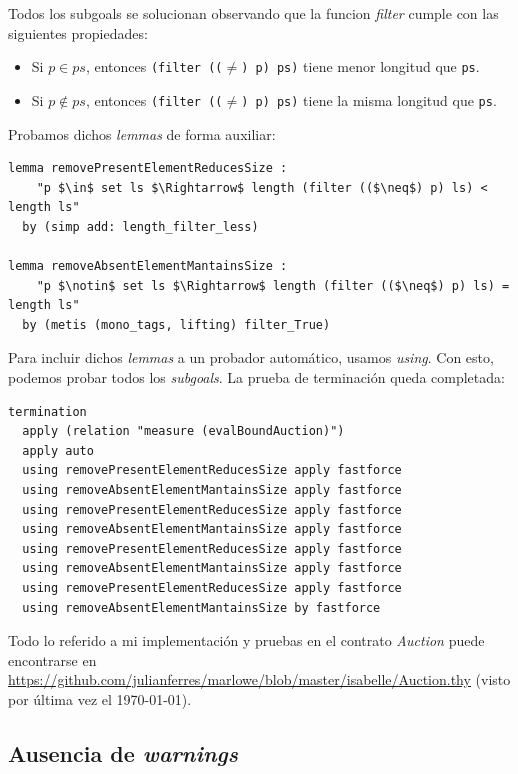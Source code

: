 \documentclass[12pt]{book}
\begin{document}
Todos los subgoals se solucionan observando que la funcion \textit{filter} cumple con las siguientes propiedades:

\begin{itemize}
    \item Si $p \in ps$, entonces \texttt{(filter (($\neq$) p) ps)} tiene menor longitud que \texttt{ps}. 
    \item Si $p \notin ps$, entonces \texttt{(filter (($\neq$) p) ps)} tiene la misma longitud que \texttt{ps}. 
\end{itemize}

Probamos dichos \textit{lemmas} de forma auxiliar:

\begin{lstlisting}[style=Isabelle]
lemma removePresentElementReducesSize :
    "p $\in$ set ls $\Rightarrow$ length (filter (($\neq$) p) ls) < length ls"
  by (simp add: length_filter_less)

lemma removeAbsentElementMantainsSize : 
    "p $\notin$ set ls $\Rightarrow$ length (filter (($\neq$) p) ls) = length ls"
  by (metis (mono_tags, lifting) filter_True)
\end{lstlisting}


Para incluir dichos \textit{lemmas} a un probador automático, usamos \textit{using}. Con esto, podemos probar todos los \textit{subgoals}. La prueba de terminación queda completada:

\begin{lstlisting}[style=Isabelle]
termination 
  apply (relation "measure (evalBoundAuction)")
  apply auto 
  using removePresentElementReducesSize apply fastforce
  using removeAbsentElementMantainsSize apply fastforce
  using removePresentElementReducesSize apply fastforce
  using removeAbsentElementMantainsSize apply fastforce
  using removePresentElementReducesSize apply fastforce
  using removeAbsentElementMantainsSize apply fastforce
  using removePresentElementReducesSize apply fastforce
  using removeAbsentElementMantainsSize by fastforce
\end{lstlisting}

Todo lo referido a mi implementación y pruebas en el contrato \textit{Auction} puede encontrarse en \url{https://github.com/julianferres/marlowe/blob/master/isabelle/Auction.thy} (visto por última vez el \today).


\subsection{Ausencia de \textit{warnings}}
\end{document}
